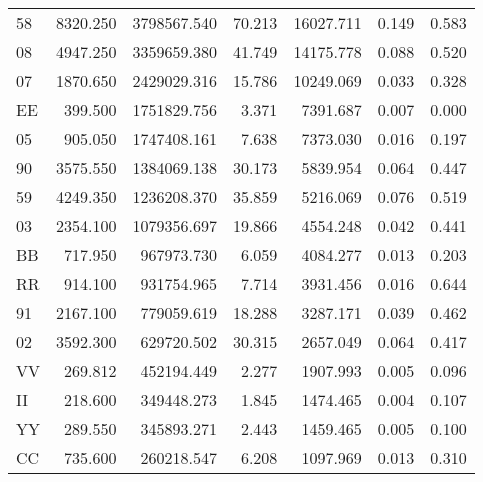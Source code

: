 \begin{tabular}{l|rrrrrr}
          58 &        8320.250 &      3798567.540 &      70.213 &            16027.711 &        0.149 &                 0.583 \\
          08 &        4947.250 &      3359659.380 &      41.749 &            14175.778 &        0.088 &                 0.520 \\
          07 &        1870.650 &      2429029.316 &      15.786 &            10249.069 &        0.033 &                 0.328 \\
          EE &         399.500 &      1751829.756 &       3.371 &             7391.687 &        0.007 &                 0.000 \\
          05 &         905.050 &      1747408.161 &       7.638 &             7373.030 &        0.016 &                 0.197 \\
          90 &        3575.550 &      1384069.138 &      30.173 &             5839.954 &        0.064 &                 0.447 \\
          59 &        4249.350 &      1236208.370 &      35.859 &             5216.069 &        0.076 &                 0.519 \\
          03 &        2354.100 &      1079356.697 &      19.866 &             4554.248 &        0.042 &                 0.441 \\
          BB &         717.950 &       967973.730 &       6.059 &             4084.277 &        0.013 &                 0.203 \\
          RR &         914.100 &       931754.965 &       7.714 &             3931.456 &        0.016 &                 0.644 \\
          91 &        2167.100 &       779059.619 &      18.288 &             3287.171 &        0.039 &                 0.462 \\
          02 &        3592.300 &       629720.502 &      30.315 &             2657.049 &        0.064 &                 0.417 \\
          VV &         269.812 &       452194.449 &       2.277 &             1907.993 &        0.005 &                 0.096 \\
          II &         218.600 &       349448.273 &       1.845 &             1474.465 &        0.004 &                 0.107 \\
          YY &         289.550 &       345893.271 &       2.443 &             1459.465 &        0.005 &                 0.100 \\
          CC &         735.600 &       260218.547 &       6.208 &             1097.969 &        0.013 &                 0.310 \\

\end{tabular}
